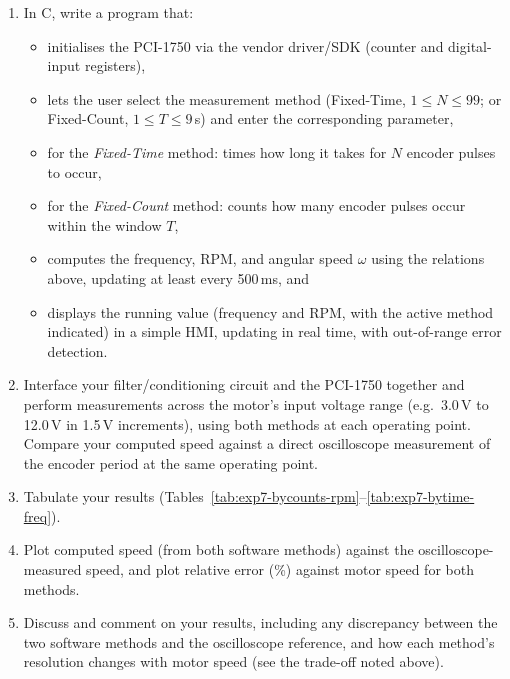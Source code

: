 \begin{procedure}
  \begin{enumerate}
    \item In C, write a program that:
          \begin{itemize}
            \item initialises the PCI-1750 via the vendor driver/SDK (counter and digital-input registers),
            \item lets the user select the measurement method (Fixed-Time, $1 \leq N \leq 99$; or Fixed-Count, $1 \leq T \leq 9$\,s) and enter the corresponding parameter, \newpage
            \item for the \emph{Fixed-Time} method: times how long it takes for $N$ encoder pulses to occur,
            \item for the \emph{Fixed-Count} method: counts how many encoder pulses occur within the window $T$,
            \item computes the frequency, RPM, and angular speed $\omega$ using the relations above, updating at least every 500\,ms, and
            \item displays the running value (frequency and RPM, with the active method indicated) in a simple HMI, updating in real time, with out-of-range error detection.
          \end{itemize}
    \item Interface your filter/conditioning circuit and the PCI-1750 together and perform measurements across the motor's input voltage range (e.g.\ 3.0\,V to 12.0\,V in 1.5\,V increments), using both methods at each operating point. Compare your computed speed against a direct oscilloscope measurement of the encoder period at the same operating point.
    \item Tabulate your results (Tables~\ref{tab:exp7-bycounts-rpm}--\ref{tab:exp7-bytime-freq}).
    \item Plot computed speed (from both software methods) against the oscilloscope-measured speed, and plot relative error (\%) against motor speed for both methods.
    \item Discuss and comment on your results, including any discrepancy between the two software methods and the oscilloscope reference, and how each method's resolution changes with motor speed (see the trade-off noted above).
  \end{enumerate}


\end{procedure}
